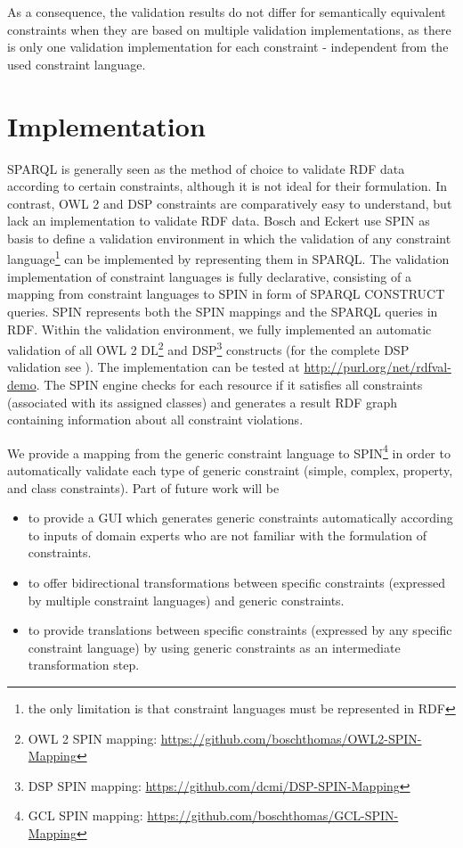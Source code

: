 \documentclass{llncs}
\begin{document}
As a consequence, the validation results do not differ for semantically equivalent constraints when they are based on multiple validation implementations, as there is only one validation implementation for each constraint - independent from the used constraint language.


\section{Implementation}
\label{sec:implementation}

SPARQL is generally seen as the method of choice to validate RDF data according to certain constraints, although it is not ideal for their formulation. 
In contrast, OWL 2 and DSP constraints are comparatively easy to understand, but lack an implementation to validate RDF data. 
Bosch and Eckert\cite{BoschEckert2014-2} use SPIN as basis to define a
validation environment in which the validation of any constraint language\footnote{the only limitation is that constraint languages must be represented in RDF} can be implemented by representing them in SPARQL. 
The validation implementation of constraint languages is fully declarative,
consisting of a mapping from constraint languages to SPIN in form of SPARQL CONSTRUCT queries.
SPIN represents both the SPIN mappings and the SPARQL queries in RDF. 
Within the validation environment, we fully implemented an automatic validation of all OWL 2 DL\footnote{OWL 2 SPIN mapping: \url{https://github.com/boschthomas/OWL2-SPIN-Mapping}} and DSP\footnote{DSP SPIN mapping: \url{https://github.com/dcmi/DSP-SPIN-Mapping}} constructs (for the complete DSP validation see \cite{BoschEckert2014-2}). 
The implementation can be tested at \url{http://purl.org/net/rdfval-demo}.
The SPIN engine checks for each resource if it satisfies all constraints (associated with its assigned classes) and generates a result RDF graph containing information about all constraint violations.

We provide a mapping from the generic constraint language to SPIN\footnote{GCL SPIN mapping: \url{https://github.com/boschthomas/GCL-SPIN-Mapping}} in order to automatically validate each type of generic constraint (simple, complex, property, and class constraints).
Part of future work will be 
\begin{itemize}
	\item to provide a GUI which generates generic constraints automatically according to inputs of domain experts who are not familiar with the formulation of constraints.
	\item to offer bidirectional transformations between specific constraints (expressed by multiple constraint languages) and generic constraints. 
	\item to provide translations between specific constraints (expressed by any specific constraint language) by using generic constraints as an intermediate transformation step.
\end{itemize}
\end{document}
